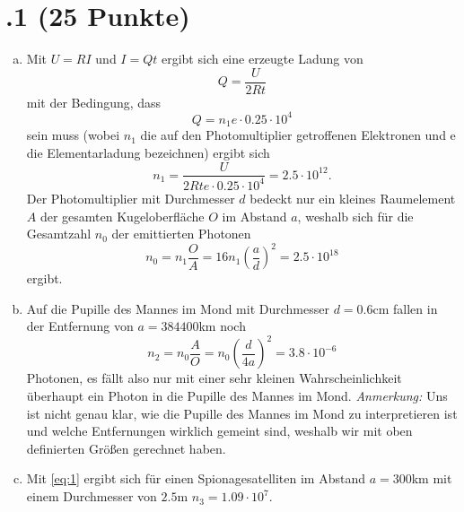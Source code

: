 \section*{\nr.1 \titone (25 Punkte)}
\begin{enumerate}[(a)]
\item Mit $U=RI$ und $I=Qt$ ergibt sich eine erzeugte Ladung von 
\begin{equation}
  Q=\frac{U}{2Rt}
\end{equation}
mit der Bedingung, dass 
\begin{equation}
  Q=n_1e\cdot0.25\cdot10^4
\end{equation}
sein muss (wobei $n_1$ die auf den Photomultiplier getroffenen Elektronen und e die Elementarladung bezeichnen) ergibt sich
\begin{equation}
   n_1=\frac{U}{2Rte\cdot 0.25\cdot10^4}=2.5\cdot10^{12}.
 \end{equation} 
Der Photomultiplier mit Durchmesser $d$ bedeckt nur ein kleines Raumelement $A$ der gesamten Kugeloberfläche $O$ im Abstand $a$, weshalb sich für die Gesamtzahl $n_0$ der emittierten Photonen
\begin{equation}
   n_0=n_1 \frac{O}{A}= 16 n_1 \left(\frac{a}{d}\right)^2=2.5\cdot10^{18}
 \end{equation} 
 ergibt.
 \item Auf die Pupille des Mannes im Mond mit Durchmesser $d=0.6$cm fallen in der Entfernung von $a=384400$km noch 
 \begin{equation}
   n_2=n_0 \frac{A}{O}=n_0 \left(\frac{d}{4a}\right)^2=3.8\cdot 10^{-6}
  \label{eq:1}
 \end{equation}
 Photonen, es fällt also nur mit einer sehr kleinen Wahrscheinlichkeit überhaupt ein Photon in die Pupille des Mannes im Mond. \emph{Anmerkung:} Uns ist nicht genau klar, wie die Pupille des Mannes im Mond zu interpretieren ist und welche Entfernungen wirklich gemeint sind, weshalb wir mit oben definierten Größen gerechnet haben.
 \item Mit \vref{eq:1} ergibt sich für einen Spionagesatelliten im Abstand $a=300$km mit einem Durchmesser von $2.5$m $n_3=1.09\cdot10^7$.

\end{enumerate}